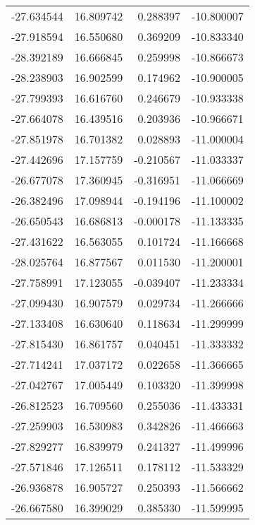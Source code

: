 \begin{tabular}{rrrr}
      -27.634544 &        16.809742 &    0.288397 & -10.800007 \\
      -27.918594 &        16.550680 &    0.369209 & -10.833340 \\
      -28.392189 &        16.666845 &    0.259998 & -10.866673 \\
      -28.238903 &        16.902599 &    0.174962 & -10.900005 \\
      -27.799393 &        16.616760 &    0.246679 & -10.933338 \\
      -27.664078 &        16.439516 &    0.203936 & -10.966671 \\
      -27.851978 &        16.701382 &    0.028893 & -11.000004 \\
      -27.442696 &        17.157759 &   -0.210567 & -11.033337 \\
      -26.677078 &        17.360945 &   -0.316951 & -11.066669 \\
      -26.382496 &        17.098944 &   -0.194196 & -11.100002 \\
      -26.650543 &        16.686813 &   -0.000178 & -11.133335 \\
      -27.431622 &        16.563055 &    0.101724 & -11.166668 \\
      -28.025764 &        16.877567 &    0.011530 & -11.200001 \\
      -27.758991 &        17.123055 &   -0.039407 & -11.233334 \\
      -27.099430 &        16.907579 &    0.029734 & -11.266666 \\
      -27.133408 &        16.630640 &    0.118634 & -11.299999 \\
      -27.815430 &        16.861757 &    0.040451 & -11.333332 \\
      -27.714241 &        17.037172 &    0.022658 & -11.366665 \\
      -27.042767 &        17.005449 &    0.103320 & -11.399998 \\
      -26.812523 &        16.709560 &    0.255036 & -11.433331 \\
      -27.259903 &        16.530983 &    0.342826 & -11.466663 \\
      -27.829277 &        16.839979 &    0.241327 & -11.499996 \\
      -27.571846 &        17.126511 &    0.178112 & -11.533329 \\
      -26.936878 &        16.905727 &    0.250393 & -11.566662 \\
      -26.667580 &        16.399029 &    0.385330 & -11.599995 \\

\end{tabular}
